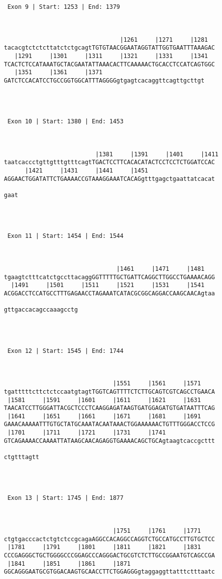 \documentclass{article}
\begin{document}
\begin{Verbatim}
 Exon 9 | Start: 1253 | End: 1379 



                                 |1261     |1271     |1281  
tacacgtctctcttatctctgcagtTGTGTAACGGAATAGGTATTGGTGAATTTAAAGAC
   |1291     |1301     |1311     |1321     |1331     |1341  
TCACTCTCCATAAATGCTACGAATATTAAACACTTCAAAAACTGCACCTCCATCAGTGGC
   |1351     |1361     |1371                             
GATCTCCACATCCTGCCGGTGGCATTTAGGGGgtgagtcacaggttcagttgcttgt




 Exon 10 | Start: 1380 | End: 1453 



                          |1381     |1391     |1401     |1411
taatcaccctgttgtttgtttcagtTGACTCCTTCACACATACTCCTCCTCTGGATCCAC
      |1421     |1431     |1441     |1451                   
AGGAACTGGATATTCTGAAAACCGTAAAGGAAATCACAGgtttgagctgaattatcacat
    
gaat




 Exon 11 | Start: 1454 | End: 1544 



                                |1461     |1471     |1481   
tgaagtctttcatctgccttacaggGGTTTTTGCTGATTCAGGCTTGGCCTGAAAACAGG
  |1491     |1501     |1511     |1521     |1531     |1541   
ACGGACCTCCATGCCTTTGAGAACCTAGAAATCATACGCGGCAGGACCAAGCAACAgtaa
                     
gttgaccacagccaaagcctg




 Exon 12 | Start: 1545 | End: 1744 



                               |1551     |1561     |1571    
tgatttttcttctctccaatgtagtTGGTCAGTTTTCTCTTGCAGTCGTCAGCCTGAACA
 |1581     |1591     |1601     |1611     |1621     |1631    
TAACATCCTTGGGATTACGCTCCCTCAAGGAGATAAGTGATGGAGATGTGATAATTTCAG
 |1641     |1651     |1661     |1671     |1681     |1691    
GAAACAAAAATTTGTGCTATGCAAATACAATAAACTGGAAAAAACTGTTTGGGACCTCCG
 |1701     |1711     |1721     |1731     |1741              
GTCAGAAAACCAAAATTATAAGCAACAGAGGTGAAAACAGCTGCAgtaagtcaccgcttt
          
ctgtttagtt




 Exon 13 | Start: 1745 | End: 1877 



                               |1751     |1761     |1771    
ctgtgacccactctgtctccgcagaAGGCCACAGGCCAGGTCTGCCATGCCTTGTGCTCC
 |1781     |1791     |1801     |1811     |1821     |1831    
CCCGAGGGCTGCTGGGGCCCGGAGCCCAGGGACTGCGTCTCTTGCCGGAATGTCAGCCGA
 |1841     |1851     |1861     |1871                        
GGCAGGGAATGCGTGGACAAGTGCAACCTTCTGGAGGGgtaggaggttatttctttaatc
   

\end{Verbatim}
\end{document}
